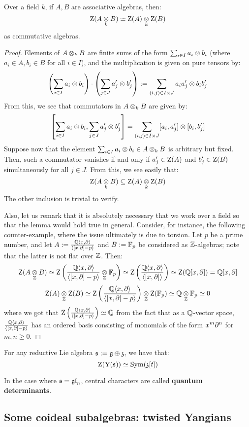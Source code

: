         \begin{lemma} \label{lemma: centres_of_tensor_products_of_algebras}
            Over a field $k$, if $A, B$ are associative algebras, then:
                $$\rmZ(A \tensor_k B) \cong \rmZ(A) \tensor_k \rmZ(B)$$
            as commutative algebras.
        \end{lemma}
            \begin{proof}
                Elements of $A \tensor_k B$ are finite sums of the form $\sum_{i \in I} a_i \tensor b_i$ (where $a_i \in A, b_i \in B$ for all $i \in I$), and the multiplication is given on pure tensors by:
                    $$\left( \sum_{i \in I} a_i \tensor b_i \right) \cdot \left( \sum_{j \in J} a'_j \tensor b'_j \right) := \sum_{(i, j) \in I \x J} a_i a'_j \tensor b_i b'_j$$
                From this, we see that commutators in $A \tensor_k B$ are given by:
                    $$\left[ \sum_{i \in I} a_i \tensor b_i, \sum_{j \in J} a'_j \tensor b'_j \right] = \sum_{(i, j) \in I \x J} [a_i, a'_j] \tensor [b_i, b'_j]$$
                Suppose now that the element $\sum_{i \in I} a_i \tensor b_i \in A \tensor_k B$ is arbitrary but fixed. Then, such a commutator vanishes if and only if $a'_j \in \mathrm{Z}(A)$ and $b'_j \in \mathrm{Z}(B)$ simultaneously for all $j \in J$. From this, we see easily that:
                    $$\rmZ(A \tensor_k B) \subseteq \rmZ(A) \tensor_k \rmZ(B)$$
                The other inclusion is trivial to verify.

                Also, let us remark that it is absolutely necessary that we work over a field so that the lemma would hold true in general. Consider, for instance, the following counter-example, where the issue ultimately is due to torsion. Let $p$ be a prime number, and let $A := \frac{\mathbb{Q}\langle x, \partial\rangle}{\langle[x, \partial] - p\rangle}$ and $B := \mathbb{F}_p$ be considered as $\mathbb{Z}$-algebras; note that the latter is not flat over $\mathbb{Z}$. Then:
                    $$\rmZ(A \tensor_{\Z} B) \cong \rmZ\left( \frac{\Q\<x, \del\>}{\<[x, \del] - p\>} \tensor_{\Z} \F_p \right) \cong \rmZ\left( \frac{\Q\<x, \del\>}{\<[x, \del]\>} \right) \cong \rmZ(\Q[x, \del]) = \Q[x, \del]$$
                    $$\rmZ(A) \tensor_{\Z} \rmZ(B) \cong \rmZ\left( \frac{\Q\<x, \del\>}{\<[x, \del] - p\>} \right) \tensor_{\Z} \rmZ(\F_p) \cong \Q \tensor_{\Z} \F_p \cong 0$$
                where we got that $\mathrm{Z}\left( \frac{\mathbb{Q}\langle x, \partial\rangle}{\langle[x, \partial] - p\rangle} \right) \simeq \mathbb{Q}$ from the fact that as a $\mathbb{Q}$-vector space, $\frac{\mathbb{Q}\langle x, \partial\rangle}{\langle[x, \partial] - p\rangle}$ has an ordered basis consisting of monomials of the form $x^m \partial^n$ for $m, n \geq 0$.
            \end{proof}
        \begin{corollary}
            For any reductive Lie algebra $\mathfrak{s} := \mathfrak{g} \oplus \mathfrak{z}$, we have that:
                $$\mathrm{Z}( \mathrm{Y}(\mathfrak{s}) ) \simeq \mathrm{Sym}(\mathfrak{z}[t])$$
        \end{corollary}
            
        \begin{definition} \label{def: quantum_determinants}
            In the case where $\mathfrak{s} = \mathfrak{gl}_n$, central characters are called \textbf{quantum determinants}.
        \end{definition}

    \subsection{Some coideal subalgebras: twisted Yangians}